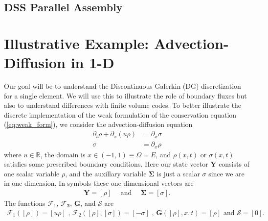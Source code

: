 \documentclass{report}
\numberwithin{equation}{section}
\begin{document}
\subsection{DSS Parallel Assembly}



\section{Illustrative Example: Advection-Diffusion in 1-D}
\label{illustrative_example}
Our goal will be to understand the Discontinuous Galerkin (DG) discretization for a single element.  We will use this to illustrate the role of boundary fluxes but also to understand differences with finite volume codes. 
To better illustrate the discrete implementation of the weak formulation of the conservation equation (\ref{eq:weak_form}), we consider the advection-diffusion equation 
\begin{align}
    \partial_t \rho + \partial_x \left( u \rho \right) &= \partial_x \sigma \\
    \sigma &= \partial_x \rho
\end{align}
where $u \in \mathbb{R}$, the domain is $x \in (-1,  1) \equiv \Omega = E$, and $\rho(x,t)$ or $\sigma(x,t)$ satisfies some prescribed boundary conditions. Here our state vector $\bm{Y}$ consists of one scalar variable $\rho$, and the auxillary variable $\bm{\Sigma}$ is just a scalar $\sigma$ since we are in one dimension. In symbols these one dimensional vectors are
\begin{align}
    \bm{Y} = [\rho] \quad \text{ and }\quad  \bm{\Sigma} = [\sigma].
\end{align}
The functions $\bm{\mathcal{F}}_1$, $\bm{\mathcal{F}_2}$, $\bm{G}$, and $\bm{\mathcal{S}}$ are 
\begin{align}
   \bm{\mathcal{F}}_1([\rho]) = [ u \rho] \text{ , }
   \bm{\mathcal{F}}_2([\rho], [\sigma]) = [-\sigma ] \text{ , } \bm{G}([\rho], x, t) = [\rho] \text{ and }  \bm{\mathcal{S}} = [0] .
\end{align}
\end{document}
